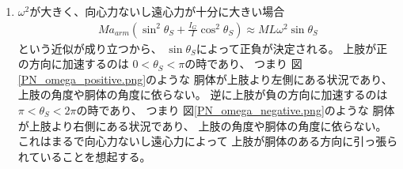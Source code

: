 \documentclass[a4paper,11pt]{jsarticle}
\begin{document}
\begin{enumerate}
  \item $\omega^2$が大きく、向心力ないし遠心力が十分に大きい場合
  \begin{align*}
    Ma_{arm}\left( \sin^2\theta_S + \frac{I_G}{I}\cos^2\theta_S \right)
    \approx ML\omega^2 \sin\theta_S
    \label{eq:PB:a_arm_MLw2}
  \end{align*}
  という近似が成り立つから、
  $\sin\theta_S$によって正負が決定される。
  上肢が正の方向に加速するのは
  $0<\theta_S<\pi$の時であり、
  つまり
  図\ref{PN_omega_positive.png}のような
  胴体が上肢より左側にある状況であり、
  上肢の角度や胴体の角度に依らない。
  逆に上肢が負の方向に加速するのは
  $\pi<\theta_S<2\pi$の時であり、
  つまり
  図\ref{PN_omega_negative.png}のような
  胴体が上肢より右側にある状況であり、
  上肢の角度や胴体の角度に依らない。
  これはまるで向心力ないし遠心力によって
  上肢が胴体のある方向に引っ張られていることを想起する。


\end{enumerate}
\end{document}
